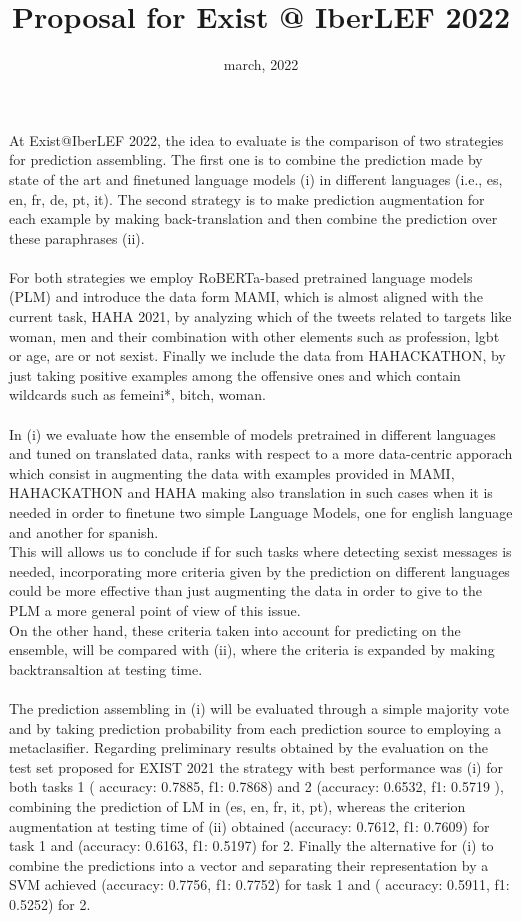 \documentclass[11pt]{article}
\title{Proposal for Exist @ IberLEF 2022  }
\date{\vspace{-13mm}march, 2022}
\begin{document}
	\maketitle 	
	
	
	At Exist@IberLEF 2022, the idea to evaluate is the comparison of two strategies for prediction assembling. The first one is to combine the prediction made by state of the art and finetuned language models (i)  in different languages (i.e., es, en, fr, de, pt, it). The second strategy is to make prediction augmentation for each example by making back-translation and then combine the prediction over these paraphrases (ii).
	\\\\	
	For both strategies we employ RoBERTa-based pretrained language models (PLM) and introduce the data form MAMI, which is almost aligned with the current task, HAHA 2021, by analyzing which of the tweets related to targets like woman, men and their combination with other elements such as profession, lgbt or age, are or not sexist. Finally we include the data from  HAHACKATHON, by just taking positive examples among the offensive ones and which contain wildcards such as femeini*, bitch, woman.\\\\
	In (i) we evaluate how the ensemble of models pretrained in different languages and tuned on translated data, ranks with respect to a more data-centric apporach which consist in augmenting the data with examples provided in MAMI, HAHACKATHON and HAHA making also translation in such cases when it is needed in order to finetune two simple Language Models, one for english language and another for spanish.\\
	This will allows us to conclude if for such tasks where detecting sexist messages is needed, incorporating more criteria given by the prediction on different languages could be more effective than just augmenting the data in order to give to the PLM a more general point of view of this issue.  \\
	On the other hand, these criteria taken into account for predicting on the ensemble, will be compared with (ii), where the criteria is expanded by making backtransaltion at testing time. 
	\\\\	
	The prediction assembling in (i) will be evaluated through a simple majority vote and by taking prediction probability from each prediction source to employing a metaclasifier. 
	\clearpage
	Regarding preliminary results obtained by the evaluation on the test set proposed for EXIST 2021 the strategy with best performance was (i) for both tasks 1 ( accuracy: 0.7885, f1: 0.7868) and 2 (accuracy: 0.6532, f1: 0.5719 ), combining the prediction of LM in (es, en, fr, it, pt), whereas the criterion augmentation at testing time of (ii) obtained  (accuracy: 0.7612, f1: 0.7609) for task 1 and  (accuracy: 0.6163, f1: 0.5197) for 2. Finally the alternative for (i) to combine the predictions into a vector and separating their representation by a SVM achieved  (accuracy: 0.7756, f1: 0.7752) for task 1 and  ( accuracy: 0.5911, f1: 0.5252) for 2. \\
	
\end{document}

